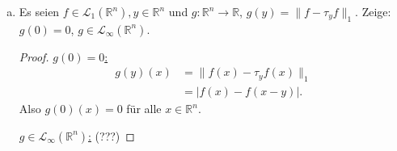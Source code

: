 \documentclass[10pt]{article}\usepackage[]{graphicx}\usepackage[]{color}
\newcommand{\R}{\mathbb{R}}
\newcommand{\df}{\,\textrm{d}}
\begin{document}
\begin{enumerate}[(a)]
\begin{enumerate}[(i)]
  \begin{proof}
  $\widehat{f}, \widehat{g}$ sind beschränkt (Bemerkung 8.3) und stetig, also $\widehat{f}g, f\widehat{g} \in \mathscr{L}_1(\R^n)$. Mit Fubini:
\begin{align*}
  \int_{\R^n} f(x)\widehat{g}(x) \df x
  &= \int_{\R^n} f(x) \left((2\pi)^{-n/2} \int_{\R^n} g(y) e^{-i\langle y, x\rangle} \df y \right) \df x \\ 
  &= (2\pi)^{-n/2} \int_{\R^n} \int_{\R^n} g(y) f(x) e^{-i\langle y, x\rangle} \df y \df x \\
  &= (2\pi)^{-n/2} \int_{\R^n} g(y) \left(\int_{\R^n} f(x) e^{-i\langle x, y \rangle} \df x\right) \df y \\
  &= \int_{\R^n} g(y) \widehat{f}(y) \df y \\
  &=  \int_{\R^n} \widehat{f}(x) g(x)  \df x. \qedhere  \end{align*}
  \end{proof}
\end{enumerate}




\item Es seien $f \in \mathscr{L}_1(\R^n), y \in \R^n$ und $g: \R^n \to \R$,
      $g(y) = \|f-\tau_y f\|_1$. Zeige: $g(0) = 0$, $g \in \mathscr{L}_{\infty}(\R^n)$.
      
      \begin{proof}
        \uline{$g(0) = 0$:}
        \begin{align*}
          g(y)(x) &= \|f(x)-\tau_yf(x)\|_1 \\
          &= |f(x) - f(x-y)|.
        \end{align*}
        Also $g(0)(x) = 0$ für alle $x \in \R^n$.
        
        \uline{$g \in \mathscr{L}_{\infty}(\R^n)$:} (???)
      \end{proof}
\end{enumerate}
\end{document}
